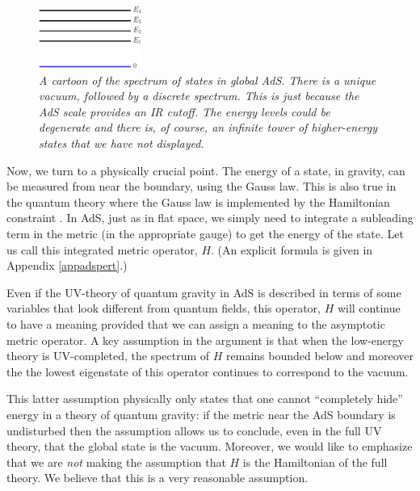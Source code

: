 \documentclass[12pt]{article}
\begin{document}
\begin{figure}[!ht]
\begin{center}
\includegraphics[width=0.3\textwidth]{enlevels_new.pdf}
\caption{\em A cartoon of the spectrum of states in global AdS. There is a unique vacuum, followed by a discrete spectrum.  This is just because the AdS scale provides an IR cutoff. The energy levels could be degenerate and there is, of course, an infinite tower of higher-energy states that we have not displayed.\label{figadsspect}}
\end{center}
\end{figure}

Now, we turn to a physically crucial point. The energy of a state, in gravity, can be measured from near the boundary,  using the Gauss law. This is also true in the quantum theory \cite{Arnowitt:1962hi, Regge:1974zd} where the Gauss law is implemented by the Hamiltonian constraint \cite{DeWitt:1967yk}.  In AdS, just as in flat space,  we simply need to integrate a subleading term in the metric (in the appropriate gauge) to get the energy of the state. Let us call this integrated metric operator, $H$. (An explicit formula is given in Appendix \ref{appadspert}.)

Even if the UV-theory of quantum gravity in AdS is described in terms of some variables that look different from quantum fields, this operator, $H$ will continue to have a meaning provided that we can assign a meaning to the asymptotic metric operator. A key assumption in the argument is that when the low-energy theory is UV-completed, the spectrum of $H$  remains bounded below and moreover the the lowest eigenstate of this operator continues to correspond to the vacuum.

 This latter assumption physically only states that one cannot ``completely hide'' energy in a theory of quantum gravity: if the metric near the AdS boundary is undisturbed then the assumption allows us to conclude, even in the full UV theory, that the global state is the vacuum. Moreover, we would like to emphasize that we are {\em not} making the assumption that $H$ is the Hamiltonian of the full theory.  We believe that this is a very reasonable assumption.
\end{document}
